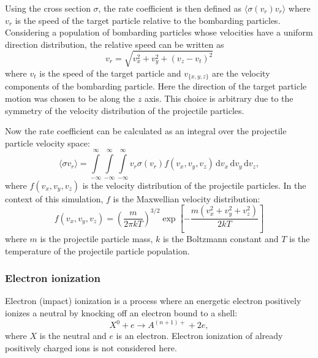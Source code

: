 \documentclass[a4paper,twoside,12pt]{article}
\begin{document}
Using the cross section $\sigma$, the rate coefficient is then defined as $\langle \sigma(v_r) v_r \rangle$ where $v_r$ is the speed of the target particle relative to the bombarding particles. Considering a population of bombarding particles whose velocities have a uniform direction distribution, the relative speed can be written as
\begin{equation}
    v_r = \sqrt{v_x^2 + v_y^2 + (v_z - v_t)^2}
\end{equation}
where $v_t$ is the speed of the target particle and $v_{\{x, y, z\}}$ are the velocity components of the bombarding particle. Here the direction of the target particle motion was chosen to be along the $z$ axis. This choice is arbitrary due to the symmetry of the velocity distribution of the projectile particles.

Now the rate coefficient can be calculated as an integral over the projectile particle velocity space:
\begin{equation}
    \label{eq:ratecoeff}
    \langle \sigma v_r \rangle = \int\limits_{-\infty}^\infty \int\limits_{-\infty}^\infty \int\limits_{-\infty}^\infty v_r \sigma(v_r) f(v_x, v_y, v_z)\,\mathrm{d}v_x\,\mathrm{d}v_y\,\mathrm{d}v_z,
\end{equation}
where $f(v_x, v_y, v_z)$ is the velocity distribution of the projectile particles. In the context of this simulation, $f$ is the Maxwellian velocity distribution:
\begin{equation}
    f(v_x, v_y, v_z) = \left(\frac{m}{2\pi kT}\right)^{3/2} \exp \left[ -\frac{m(v_x^2 + v_y^2 + v_z^2)}{2kT} \right]
\end{equation}
where $m$ is the projectile particle mass, $k$ is the Boltzmann constant and $T$ is the temperature of the projectile particle population.

\subsubsection{Electron ionization}
Electron (impact) ionization is a process where an energetic electron
positively ionizes a neutral by knocking off an electron bound to a shell:
\[
    X^0 + e \rightarrow A^{(n+1)+} + 2e,
\]
where $X$ is the neutral and $e$ is an electron. Electron ionization of already
positively charged ions is not considered here.
\end{document}
